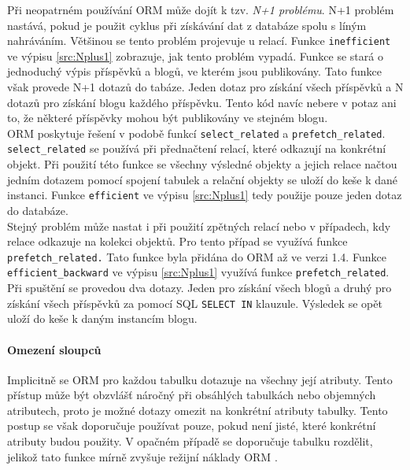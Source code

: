 \documentclass[ing,male,java,dept456]{diploma}						%
\begin{document}
Při neopatrném používání ORM může dojít k tzv. \textit{N+1 problému}. N+1 problém nastává, pokud je použit cyklus při získávání dat z databáze spolu s líným nahráváním. Většinou se tento problém projevuje u relací. Funkce \lstinline[style=custompython]|inefficient| ve výpisu \ref{src:Nplus1} zobrazuje, jak tento problém vypadá. Funkce se stará o jednoduchý výpis příspěvků a blogů, ve kterém jsou publikovány. Tato funkce však provede N+1 dotazů do tabáze. Jeden dotaz pro získání všech příspěvků a N dotazů pro získání blogu každého příspěvku. Tento kód navíc nebere v potaz ani to, že některé příspěvky mohou být publikovány ve stejném blogu. \\
ORM poskytuje řešení v podobě funkcí \lstinline[style=custompython]|select_related| a \lstinline[style=custompython]|prefetch_related|. \\ 
\lstinline[style=custompython]|select_related| se používá při přednačtení relací, které odkazují na konkrétní objekt. Při použití této funkce se všechny výsledné objekty a jejich relace načtou jedním dotazem pomocí spojení tabulek a relační objekty se uloží do keše k dané instanci. Funkce \lstinline[style=custompython]|efficient| ve výpisu \ref{src:Nplus1} tedy použije pouze jeden dotaz do databáze. \\
Stejný problém může nastat i při použití zpětných relací nebo v případech, kdy relace odkazuje na kolekci objektů. Pro tento případ se využívá funkce \lstinline[style=custompython]|prefetch_related.| Tato funkce byla přidána do ORM až ve verzi 1.4. Funkce \lstinline[style=custompython]|efficient_backward| ve výpisu \ref{src:Nplus1} využívá funkce \lstinline[style=custompython]|prefetch_related|. Při spuštění se provedou dva dotazy. Jeden pro získání všech blogů a druhý pro získání všech příspěvků za pomocí SQL \lstinline[style=customsql]|SELECT IN| klauzule. Výsledek se opět uloží do keše k daným instancím blogu. 

\paragraph{Omezení sloupců}

Implicitně se ORM pro každou tabulku dotazuje na všechny její atributy. Tento přístup může být obzvlášť náročný při obsáhlých tabulkách nebo objemných atributech, proto je možné dotazy omezit na konkrétní atributy tabulky. Tento postup se však doporučuje používat pouze, pokud není jisté, které konkrétní atributy budou použity. V opačném případě se doporučuje tabulku rozdělit, jelikož tato funkce mírně zvyšuje režijní náklady ORM \cite{dj-defer}.
\end{document}
